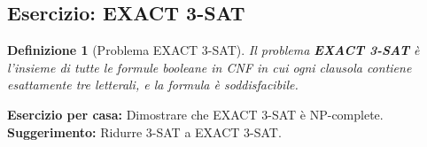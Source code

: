 \documentclass[a4paper]{article}
\newtheorem{definition}{Definizione}
\begin{document}
\subsection{Esercizio: EXACT 3-SAT}
\begin{definition}[Problema EXACT 3-SAT]
Il problema \textbf{EXACT 3-SAT} è l'insieme di tutte le formule booleane in CNF in cui ogni clausola contiene \emph{esattamente} tre letterali, e la formula è soddisfacibile.
\end{definition}

\textbf{Esercizio per casa:} Dimostrare che EXACT 3-SAT è NP-complete.
\textbf{Suggerimento:} Ridurre 3-SAT a EXACT 3-SAT.
\end{document}
